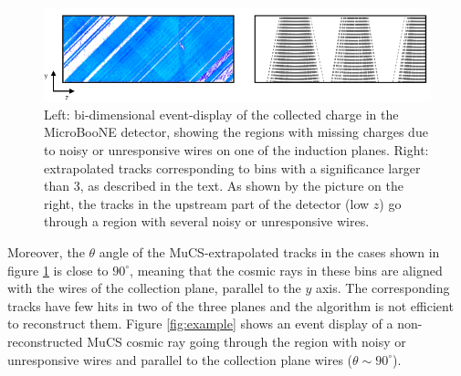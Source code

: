 \documentclass[a4paper,11pt]{article}
\begin{document}
\begin{figure}[htbp]
  \begin{center}
    \includegraphics[width=1\linewidth]{figures/wire_tracks.png}
    \caption{Left: bi-dimensional event-display of the collected charge in the MicroBooNE detector, showing the regions with missing charges due to noisy or unresponsive wires on one of the induction planes. Right: extrapolated tracks corresponding to bins with a significance larger than 3, as described in the text. As shown by the picture on the right, the tracks in the upstream part of the detector (low $z$) go through a region with several noisy or unresponsive wires.} \label{fig:wires}
  \end{center}
\end{figure}


Moreover, the $\theta$ angle of the MuCS-extrapolated tracks in the cases shown in figure \ref{fig:wires} is close to $90^\circ$, meaning that the cosmic rays in these bins are aligned with the wires of the collection plane, parallel to the $y$ axis. The corresponding tracks have few hits in two of the three planes and the algorithm is not efficient to reconstruct them. Figure \ref{fig:example} shows an event display of a non-reconstructed MuCS cosmic ray going through the region with noisy or unresponsive wires and parallel to the collection plane wires ($\theta \sim 90^\circ$).
\end{document}

